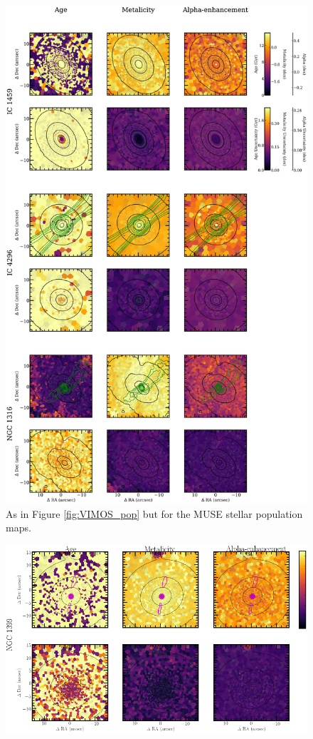 		\begin{figure}
			\centering
			\includegraphics[height=0.94\textheight]{chapter4/muse/pop1.png}
			\caption[MUSE stellar population maps]{As in Figure \ref{fig:VIMOS_pop} but for the MUSE stellar population maps.}
			\label{fig:MUSE_pop}
		\end{figure}
		\begin{figure}
			\centering
			\includegraphics[height=0.31\textheight]{chapter4/muse/pop2.png}
		\end{figure}

